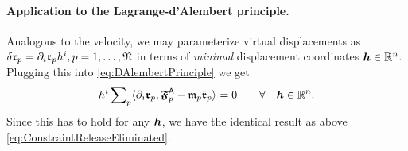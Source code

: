 \paragraph{Application to the Lagrange-d'Alembert principle.}
Analogous to the velocity, we may parameterize virtual displacements as $\delta \boldsymbol{\mathfrak{r}}_{p} = \partial_{i} \boldsymbol{\mathfrak{r}}_{p} h^{i}, p = 1,\ldots,\mathfrak{N}$ in terms of \textit{minimal} displacement coordinates $\boldsymbol{h}\in\mathbb{R}^n$.
Plugging this into \eqref{eq:DAlembertPrinciple} we get
\begin{align}\label{eq:DAlembertPrincipleBasis}
 h^{i} \sum\nolimits_{p} \langle \partial_{i} \boldsymbol{\mathfrak{r}}_{p} , \boldsymbol{\mathfrak{F}}_{p}^{\mathsf{A}} - \mathfrak{m}_{p}\ddot{\boldsymbol{\mathfrak{r}}}_{p} \rangle_{} = 0 \qquad \forall \quad \boldsymbol{h}\in\mathbb{R}^n.
\end{align}
Since this has to hold for any $\boldsymbol{h}$, we have the identical result as above \eqref{eq:ConstraintReleaseEliminated}.


